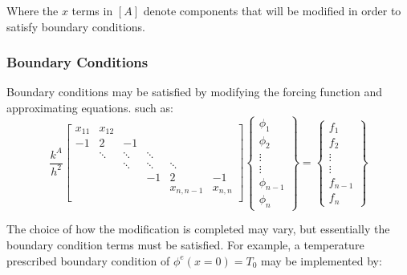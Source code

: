 \documentclass[letterpaper, 10pt, oneside]{article}
\begin{document}
Where the $x$ terms in $[A]$ denote components that will be modified in order to satisfy boundary conditions. 

\subsubsection{Boundary Conditions}
Boundary conditions may be satisfied by modifying the forcing function and approximating equations.   such as:
\[\frac{k^A}{h^2}
\begin{bmatrix}
		x_{11}	&x_{12} &		&		&			&\\
		-1		&2		& -1	&	 	&			&\\
				&\ddots	& \ddots& \ddots& 			&\\	
				&		& \ddots& \ddots& \ddots	&\\	
				&		&		&-1		& 2			& -1\\		
				& 		&		&		&x_{n,n-1}	&x_{n,n}\\
\end{bmatrix}
\begin{Bmatrix}
	\phi_1 \\ \phi_2 \\ \vdots \\ \vdots \\ \phi_{n-1} \\ \phi_{n}
\end{Bmatrix}
=
\begin{Bmatrix}
	f_1 \\ f_2 \\ \vdots \\ \vdots \\ f_{n-1} \\ f_{n}
\end{Bmatrix}
\]

The choice of how the modification is completed may vary, but essentially the boundary condition terms must be satisfied.  For example, a temperature prescribed boundary condition of $\phi^e(x=0) = T_0$ may be implemented by:
\end{document}

